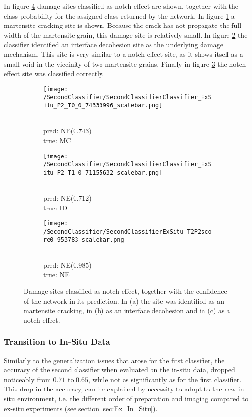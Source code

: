 In figure \ref{fig:ExSituNotchEffectSamples} damage sites classified as notch effect are shown, together with the class probability for the assigned class returned by the network. In figure \ref{sub:ExSituNotchEffectSamplesM} a martensite cracking site is shown. Because the crack has not propagate the full width of the martensite grain, this damage site is relatively small. In figure \ref{sub:ExSituNotchEffectSamplesI} the classifier identified an interface decohesion site as the underlying damage mechanism. This site is very similar to a notch effect site, as it shows itself as a small void in the viccinity of two martensite grains. Finally in figure \ref{sub:ExSituNotchEffectSamplesN} the notch effect site was classified correctly. 

\begin{figure}[H]
\centering
\begin{subfigure}{0.3\textwidth}
\texttt{[image: /SecondClassifier/SecondClassifierClassifier\_ExSitu\_P2\_T0\_0\_74333996\_scalebar.png]}
\caption{\\pred: NE($0.743$) \\ true: MC}
\label{sub:ExSituNotchEffectSamplesM}
\end{subfigure}
\begin{subfigure}{0.3\textwidth}
\texttt{[image: /SecondClassifier/SecondClassifierClassifier\_ExSitu\_P2\_T1\_0\_71155632\_scalebar.png]}
\caption{\\pred: NE($0.712$) \\ true: ID}
\label{sub:ExSituNotchEffectSamplesI}
\end{subfigure}
\begin{subfigure}{0.3\textwidth}
\texttt{[image: /SecondClassifier/SecondClassifierExSitu\_T2P2score0\_953783\_scalebar.png]}
\caption{\\pred: NE($0.985$) \\ true: NE}
\label{sub:ExSituNotchEffectSamplesN}
\end{subfigure}
\caption{Damage sites classified as notch effect, together with the confidence of the network in its prediction. In (a) the site was identified as an martensite cracking, in (b) as an interface decohesion and in (c) as a notch effect. }
\label{fig:ExSituNotchEffectSamples}
\end{figure}


\subsubsection{Transition to In-Situ Data}
Similarly to the generalization issues that arose for the first classifier, the accuracy of the second classifier when evaluated on the in-situ data, dropped noticeably from $0.71$ to $0.65$, while not as significantly as for the first classifier. This drop in the accuracy, can be explained by necessity to adopt to the new in-situ environment, i.e. the different order of preparation and imaging compared to ex-situ experiments (see section \ref{sec:Ex_In_Situ}).

